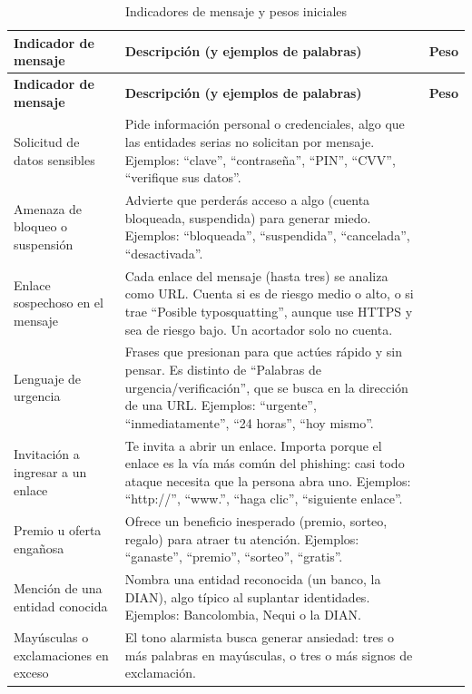 \documentclass[journal,onecolumn,12pt,draftclsnofoot]{IEEEtran}
\begin{document}
\endgroup

\begingroup
\footnotesize
\setlength{\tabcolsep}{3pt}
\begin{longtable}{|>{\raggedright\arraybackslash}p{}|>{\raggedright\arraybackslash}p{}|>{\raggedright\arraybackslash}p{}|}
\caption{Indicadores de mensaje y pesos iniciales}\label{tab:indmsg}\\
\hline
\textbf{Indicador de mensaje} & \textbf{Descripción (y ejemplos de palabras)} & \textbf{Peso} \\ \hline
\endfirsthead
\hline
\textbf{Indicador de mensaje} & \textbf{Descripción (y ejemplos de palabras)} & \textbf{Peso} \\ \hline
\endhead
Solicitud de datos sensibles & Pide información personal o credenciales, algo que las entidades serias no solicitan por mensaje. Ejemplos: ``clave'', ``contraseña'', ``PIN'', ``CVV'', ``verifique sus datos''. & 25 \\ \hline
Amenaza de bloqueo o suspensión & Advierte que perderás acceso a algo (cuenta bloqueada, suspendida) para generar miedo. Ejemplos: ``bloqueada'', ``suspendida'', ``cancelada'', ``desactivada''. & 20 \\ \hline
Enlace sospechoso en el mensaje & Cada enlace del mensaje (hasta tres) se analiza como URL. Cuenta si es de riesgo medio o alto, o si trae ``Posible typosquatting'', aunque use HTTPS y sea de riesgo bajo. Un acortador solo no cuenta. & 20 \\ \hline
Lenguaje de urgencia & Frases que presionan para que actúes rápido y sin pensar. Es distinto de ``Palabras de urgencia/verificación'', que se busca en la dirección de una URL. Ejemplos: ``urgente'', ``inmediatamente'', ``24 horas'', ``hoy mismo''. & 15 \\ \hline
Invitación a ingresar a un enlace & Te invita a abrir un enlace. Importa porque el enlace es la vía más común del phishing: casi todo ataque necesita que la persona abra uno. Ejemplos: ``http://'', ``www.'', ``haga clic'', ``siguiente enlace''. & 15 \\ \hline
Premio u oferta engañosa & Ofrece un beneficio inesperado (premio, sorteo, regalo) para atraer tu atención. Ejemplos: ``ganaste'', ``premio'', ``sorteo'', ``gratis''. & 15 \\ \hline
Mención de una entidad conocida & Nombra una entidad reconocida (un banco, la DIAN), algo típico al suplantar identidades. Ejemplos: Bancolombia, Nequi o la DIAN. & 10 \\ \hline
Mayúsculas o exclamaciones en exceso & El tono alarmista busca generar ansiedad: tres o más palabras en mayúsculas, o tres o más signos de exclamación. & 5 \\ \hline
\end{longtable}
\endgroup
\end{document}
